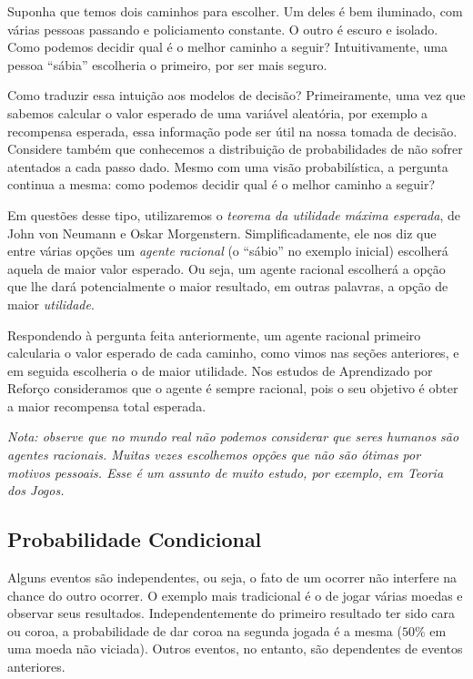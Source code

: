 \documentclass{article}
\begin{document}
            Suponha que temos dois caminhos para escolher. Um deles é bem iluminado, com várias pessoas passando e policiamento constante. O outro é escuro e isolado. Como podemos decidir qual é o melhor caminho a seguir? Intuitivamente, uma pessoa ``sábia'' escolheria o primeiro, por ser mais seguro.

            Como traduzir essa intuição aos modelos de decisão? Primeiramente, uma vez que sabemos calcular o valor esperado de uma variável aleatória, por exemplo a recompensa esperada, essa informação pode ser útil na nossa tomada de decisão. Considere também que conhecemos a distribuição de probabilidades de não sofrer atentados a cada passo dado. Mesmo com uma visão probabilística, a pergunta continua a mesma: como podemos decidir qual é o melhor caminho a seguir?

            Em questões desse tipo, utilizaremos o \emph{teorema da utilidade máxima esperada}, de John von Neumann e Oskar Morgenstern. Simplificadamente, ele nos diz que entre várias opções um \emph{agente racional} (o ``sábio'' no exemplo inicial) escolherá aquela de maior valor esperado. Ou seja, um agente racional escolherá a opção que lhe dará potencialmente o maior resultado, em outras palavras, a opção de maior \emph{utilidade}. 
            
            Respondendo à pergunta feita anteriormente, um agente racional primeiro calcularia o valor esperado de cada caminho, como vimos nas seções anteriores, e em seguida escolheria o de maior utilidade. Nos estudos de Aprendizado por Reforço consideramos que o agente é sempre racional, pois o seu objetivo é obter a maior recompensa total esperada.
            
            \emph{Nota: observe que no mundo real não podemos considerar que seres humanos são agentes racionais. Muitas vezes escolhemos opções que não são ótimas por motivos pessoais. Esse é um assunto de muito estudo, por exemplo, em \emph{Teoria dos Jogos}.}
            
        \subsection{Probabilidade Condicional}
        
            Alguns eventos são independentes, ou seja, o fato de um ocorrer não interfere na chance do outro ocorrer. O exemplo mais tradicional é o de jogar várias moedas e observar seus resultados. Independentemente do primeiro resultado ter sido cara ou coroa, a probabilidade de dar coroa na segunda jogada é a mesma ($50\%$ em uma moeda não viciada). Outros eventos, no entanto, são dependentes de eventos anteriores.
            
\end{document}
